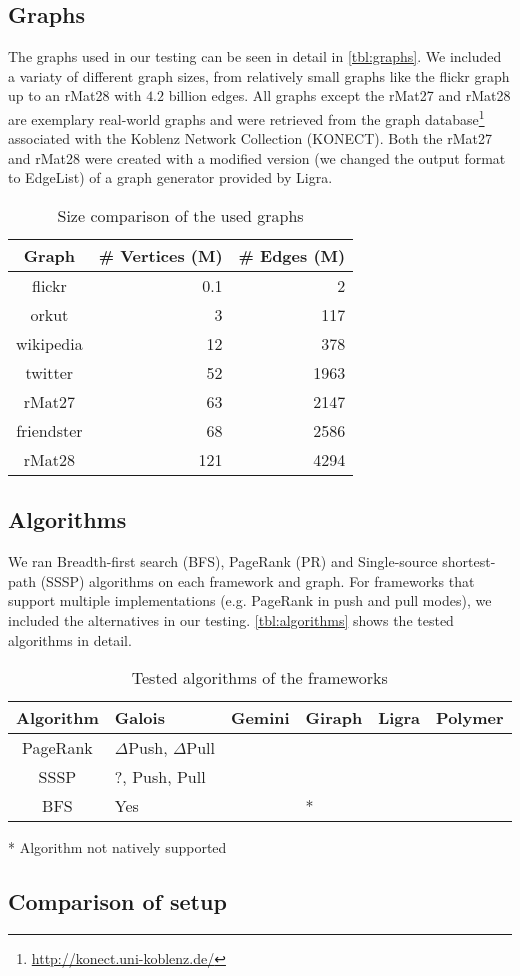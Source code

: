 \subsection{Graphs}
The graphs used in our testing can be seen in detail in \autoref{tbl:graphs}. We included a variaty of different graph sizes, from relatively small graphs like the flickr graph up to an rMat28 with $4.2$ billion edges. All graphs except the rMat27 and rMat28 are exemplary real-world graphs and were retrieved from the graph database\footnote{\url{http://konect.uni-koblenz.de/}} associated with the Koblenz Network Collection (KONECT)\cite{konect}.
Both the rMat27 and rMat28 were created with a modified version (we changed the output format to EdgeList) of a graph generator provided by Ligra.
\begin{table}
	\centering
	\begin{tabular}{crr}
		\hline
		\bf{Graph}&\# Vertices (M)&\# Edges (M)\\\hline
		flickr&    		0.1&  2\\
		orkut&          3&    117\\
		wikipedia&      12&   378\\
		twitter&     	52&   1963\\
		rMat27&         63&   2147\\
		friendster&     68&   2586\\
		rMat28&         121&  4294\\
		\hline
	\end{tabular}
	\caption{Size comparison of the used graphs}
	\label{tbl:graphs}
\end{table}


\subsection{Algorithms}
We ran Breadth-first search (BFS), PageRank (PR) and Single-source shortest-path (SSSP) algorithms on each framework and graph.
For frameworks that support multiple implementations (e.g. PageRank in push and pull modes), we included the alternatives in our testing. 
\autoref{tbl:algorithms} shows the tested algorithms in detail.
\newcommand{\txtdag}{\textsuperscript{\textdagger}}
\begin{table}
	\centering
	\begin{tabularx}{0.9\columnwidth}{cYYYYY}
		\bf{Algorithm}&Galois&Gemini&Giraph&Ligra&Polymer\\\hline
		PageRank&$\Delta$Push, $\Delta$Pull&&&&\\
		SSSP&?, Push, Pull&&&&\\
		BFS&Yes&&*&&\\
		\hline
	\end{tabularx}
	\caption{Tested algorithms of the frameworks}
	\label{tbl:algorithms}

	* Algorithm not natively supported

\end{table}


\subsection{Comparison of setup}

